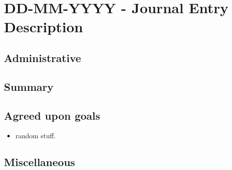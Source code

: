 \documentclass[12pt]{article}
\begin{document}
	\section{DD-MM-YYYY - Journal Entry Description}
	
	\subsection{Administrative}
	
	\subsection{Summary}
	
	\subsection{Agreed upon goals}
	\begin{itemize}
		\item random stuff.
	\end{itemize}
	
	\subsection{Miscellaneous}
	
	\pagebreak
	
\end{document}
